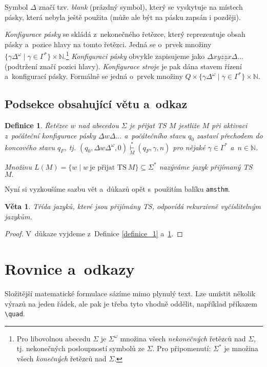 \documentclass[a4paper, 11pt, twocolumn]{article}
\theoremstyle{plain}
\newtheorem{definition}{Definice}
\theoremstyle{plain}
\newtheorem{sentence}{Věta}
\begin{document}
Symbol $\Delta$ značí tzv. \emph{blank} (prázdný symbol), který se vyskytuje na místech pásky, která nebyla ještě použita (může ale být na pásku zapsán i později).

\emph{Konfigurace pásky} se skládá z~nekonečného řetězce,
který reprezentuje obsah pásky a~pozice hlavy na tomto řetězci. Jedná se o~prvek množiny $\{\gamma \Delta^\omega\mid\gamma\in\Gamma^*\}\times\mathbb{N}$.\footnote{Pro libovolnou abecedu $\Sigma$ je $\Sigma^\omega$ množina všech \emph{nekonečných} řetězců nad $\Sigma$, tj. nekonečných posloupností symbolů ze $\Sigma$. Pro připomenutí: $\Sigma^*$ je množina všech \emph{konečných} řetězců nad $\Sigma$.}
\emph{Konfiguraci pásky} obvykle zapisujeme jako $\Delta xyz\underline{z}x\Delta...$ (podtržení značí pozici hlavy). \emph{Konfigurace stroje} je pak dána stavem řízení a~konfigurací pásky. Formálně se jedná o~prvek množiny $Q\times\{\gamma\Delta^\omega\mid\gamma\in\Gamma^*\}\times\mathbb{N}$.

\subsection{Podsekce obsahující větu a~odkaz}
\begin{definition} \label{definice_2}
\textnormal{Řetězec $w$ nad abecedou $\Sigma$ je přijat TS $M$} jestliže $M$ při aktivaci z~počáteční konfigurace pásky $\underline{\Delta}w\Delta...$ a~počátečního stavu $q_0$ zastaví přechodem do koncového stavu $q_F$, tj. $( q_0,\Delta w\Delta^\omega,0) \overset{*}{\underset{M}{\vdash}} (q_F,\gamma,n)$ pro nějaké $\gamma \in \Gamma^*$ a~$n\in\mathbb{N}$.

Množinu $L(M)=\{w\mid w\ \text{je přijat TS} \ M\}\subseteq\Sigma^*$ nazýváme \textnormal{jazyk přijímaný TS $M.$}
\end{definition}
Nyní si vyzkoušíme sazbu vět a~důkazů opět s~použitím
balíku \verb|amsthm|.
\begin{sentence} \label{veta_1}
Třída jazyků, které jsou přijímány TS, odpovídá \textnormal{rekurzivně vyčíslitelným jazykům}.
\end{sentence}
\begin{proof} \label{dukaz_1}
V~důkaze vyjdeme z~Definice \ref{definice_1} a~\ref{definice_2}.
\end{proof}

\section{Rovnice a~odkazy}
Složitější matematické formulace sázíme mimo plynulý text. Lze umístit několik výrazů na jeden řádek, ale pak je třeba tyto vhodně oddělit, například příkazem \verb|\quad|.
\end{document}
